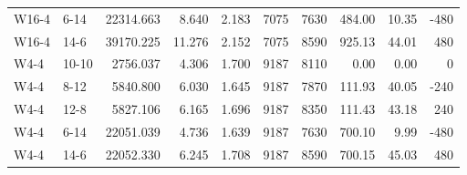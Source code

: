 \begin{table}[t]
\begin{tabular}{llrrrrrrrr}
W16-4 & 6-14 & 22314.663 & 8.640 & 2.183 & 7075 & 7630 & 484.00 & 10.35 & -480 \\
W16-4 & 14-6 & 39170.225 & 11.276 & 2.152 & 7075 & 8590 & 925.13 & 44.01 & 480 \\
W4-4 & 10-10 & 2756.037 & 4.306 & 1.700 & 9187 & 8110 & 0.00 & 0.00 & 0 \\
W4-4 & 8-12 & 5840.800 & 6.030 & 1.645 & 9187 & 7870 & 111.93 & 40.05 & -240 \\
W4-4 & 12-8 & 5827.106 & 6.165 & 1.696 & 9187 & 8350 & 111.43 & 43.18 & 240 \\
W4-4 & 6-14 & 22051.039 & 4.736 & 1.639 & 9187 & 7630 & 700.10 & 9.99 & -480 \\
W4-4 & 14-6 & 22052.330 & 6.245 & 1.708 & 9187 & 8590 & 700.15 & 45.03 & 480 \\
\bottomrule
\end{tabular}
\end{table}

